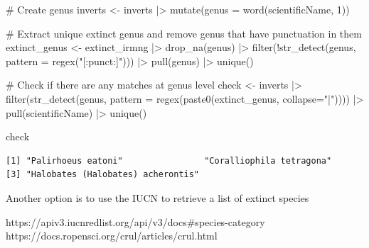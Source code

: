 \documentclass[
  letterpaper,
  DIV=11,
  numbers=noendperiod,
  oneside]{scrreprt}
\newenvironment{Shaded}{\begin{snugshade}}{\end{snugshade}}
\newcommand{\AttributeTok}[1]{\textcolor[rgb]{0.40,0.45,0.13}{#1}}
\newcommand{\CommentTok}[1]{\textcolor[rgb]{0.37,0.37,0.37}{#1}}
\newcommand{\DecValTok}[1]{\textcolor[rgb]{0.68,0.00,0.00}{#1}}
\newcommand{\FunctionTok}[1]{\textcolor[rgb]{0.28,0.35,0.67}{#1}}
\newcommand{\NormalTok}[1]{\textcolor[rgb]{0.00,0.23,0.31}{#1}}
\newcommand{\OtherTok}[1]{\textcolor[rgb]{0.00,0.23,0.31}{#1}}
\newcommand{\SpecialCharTok}[1]{\textcolor[rgb]{0.37,0.37,0.37}{#1}}
\newcommand{\StringTok}[1]{\textcolor[rgb]{0.13,0.47,0.30}{#1}}
\begin{document}
\begin{Shaded}
\begin{Highlighting}[]
\CommentTok{\# Create genus }
\NormalTok{inverts }\OtherTok{\textless{}{-}}\NormalTok{ inverts }\SpecialCharTok{|\textgreater{}} 
  \FunctionTok{mutate}\NormalTok{(}\AttributeTok{genus =} \FunctionTok{word}\NormalTok{(scientificName, }\DecValTok{1}\NormalTok{)) }

\CommentTok{\# Extract unique extinct genus and remove genus that have punctuation in them}
\NormalTok{extinct\_genus }\OtherTok{\textless{}{-}}\NormalTok{ extinct\_irmng }\SpecialCharTok{|\textgreater{}} 
  \FunctionTok{drop\_na}\NormalTok{(genus) }\SpecialCharTok{|\textgreater{}} 
  \FunctionTok{filter}\NormalTok{(}\SpecialCharTok{!}\FunctionTok{str\_detect}\NormalTok{(genus, }\AttributeTok{pattern =} \FunctionTok{regex}\NormalTok{(}\StringTok{"[:punct:]"}\NormalTok{))) }\SpecialCharTok{|\textgreater{}} 
  \FunctionTok{pull}\NormalTok{(genus) }\SpecialCharTok{|\textgreater{}} 
  \FunctionTok{unique}\NormalTok{() }
 
\CommentTok{\# Check if there are any matches at genus level}
\NormalTok{check }\OtherTok{\textless{}{-}}\NormalTok{ inverts }\SpecialCharTok{|\textgreater{}} 
\FunctionTok{filter}\NormalTok{(}\FunctionTok{str\_detect}\NormalTok{(genus, }\AttributeTok{pattern =} \FunctionTok{regex}\NormalTok{(}\FunctionTok{paste0}\NormalTok{(extinct\_genus, }\AttributeTok{collapse=}\StringTok{"|"}\NormalTok{)))) }\SpecialCharTok{|\textgreater{}} 
  \FunctionTok{pull}\NormalTok{(scientificName) }\SpecialCharTok{|\textgreater{}} 
  \FunctionTok{unique}\NormalTok{() }

\NormalTok{check}
\end{Highlighting}
\end{Shaded}

\begin{verbatim}
[1] "Palirhoeus eatoni"                "Coralliophila tetragona"         
[3] "Halobates (Halobates) acherontis"
\end{verbatim}

Another option is to use the IUCN to retrieve a list of extinct species

https://apiv3.iucnredlist.org/api/v3/docs\#species-category
https://docs.ropensci.org/crul/articles/crul.html
\end{document}
